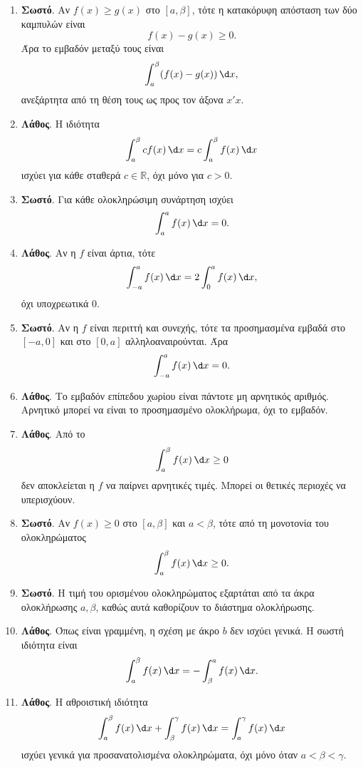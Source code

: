 \begin{enumerate}[label=\textbf{3.\arabic*.}]
\item \textbf{Σωστό}. Αν $f(x)\geq g(x)$ στο $[a,\beta]$, τότε η κατακόρυφη απόσταση των δύο καμπυλών είναι
\[
f(x)-g(x)\geq0.
\]
Άρα το εμβαδόν μεταξύ τους είναι
\[
\dint_a^\beta (f(x)-g(x))\,\d x,
\]
ανεξάρτητα από τη θέση τους ως προς τον άξονα $x'x$.

\item \textbf{Λάθος}. Η ιδιότητα
\[
\dint_a^\beta c f(x)\,\d x
=c\dint_a^\beta f(x)\,\d x
\]
ισχύει για κάθε σταθερά $c\in\mathbb{R}$, όχι μόνο για $c>0$.

\item \textbf{Σωστό}. Για κάθε ολοκληρώσιμη συνάρτηση ισχύει
\[
\dint_a^a f(x)\,\d x=0.
\]

\item \textbf{Λάθος}. Αν η $f$ είναι άρτια, τότε
\[
\dint_{-a}^{a} f(x)\,\d x=2\dint_0^a f(x)\,\d x,
\]
όχι υποχρεωτικά $0$.

\item \textbf{Σωστό}. Αν η $f$ είναι περιττή και συνεχής, τότε τα προσημασμένα εμβαδά στο $[-a,0]$ και στο $[0,a]$ αλληλοαναιρούνται. Άρα
\[
\dint_{-a}^{a} f(x)\,\d x=0.
\]

\item \textbf{Λάθος}. Το εμβαδόν επίπεδου χωρίου είναι πάντοτε μη αρνητικός αριθμός. Αρνητικό μπορεί να είναι το προσημασμένο ολοκλήρωμα, όχι το εμβαδόν.

\item \textbf{Λάθος}. Από το
\[
\dint_a^\beta f(x)\,\d x\geq0
\]
δεν αποκλείεται η $f$ να παίρνει αρνητικές τιμές. Μπορεί οι θετικές περιοχές να υπερισχύουν.

\item \textbf{Σωστό}. Αν $f(x)\geq0$ στο $[a,\beta]$ και $a<\beta$, τότε από τη μονοτονία του ολοκληρώματος
\[
\dint_a^\beta f(x)\,\d x\geq0.
\]

\item \textbf{Σωστό}. Η τιμή του ορισμένου ολοκληρώματος εξαρτάται από τα άκρα ολοκλήρωσης $a,\beta$, καθώς αυτά καθορίζουν το διάστημα ολοκλήρωσης.

\item \textbf{Λάθος}. Όπως είναι γραμμένη, η σχέση με άκρο $b$ δεν ισχύει γενικά. Η σωστή ιδιότητα είναι
\[
\dint_a^\beta f(x)\,\d x
=
-\dint_\beta^a f(x)\,\d x.
\]

\item \textbf{Λάθος}. Η αθροιστική ιδιότητα
\[
\dint_a^\beta f(x)\,\d x+\dint_\beta^\gamma f(x)\,\d x
=\dint_a^\gamma f(x)\,\d x
\]
ισχύει γενικά για προσανατολισμένα ολοκληρώματα, όχι μόνο όταν $a<\beta<\gamma$.


\end{enumerate}
